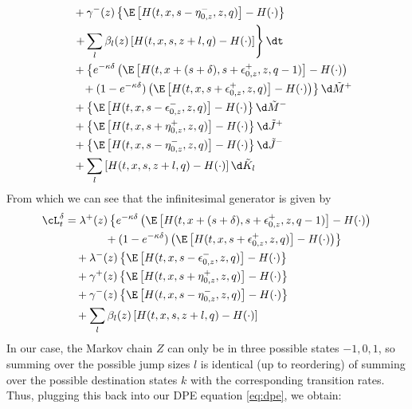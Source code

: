 \documentclass[12pt]{article}
\begin{document}
\begin{align*}
& \quad + \gamma^-(z) \left\lbrace \E \left[ H(t,x, s-\eta^-_{0,z},z,q) \right] - H(\cdot) \right\rbrace \\
& \left. \quad + \sum_l \beta_l(z) \left[ H(t,x,s,z+l,q) - H(\cdot) \right] \right\rbrace \dt \\
& \quad + \left\lbrace  e^{ -\kappa \delta } \left( \E \left[ H(t,x + (s + \delta), s + \epsilon^+_{0,z}, z, q-1) \right] - H(\cdot) \right) \right. \\
& \left. \phantom{ + \left\lbrace \right.} + (1 - e^{-\kappa \delta}) \left( \E \left[ H(t, x, s+\epsilon^+_{0,z},z,q) \right] - H(\cdot) \right) \right\rbrace \d \tilde{M}^+ \\
& \quad + \left\lbrace \E \left[ H(t,x, s-\epsilon^-_{0,z},z,q) \right] - H(\cdot) \right\rbrace \d \tilde{M}^- \\
& \quad + \left\lbrace \E \left[ H(t,x, s+\eta^+_{0,z},z,q) \right] - H(\cdot) \right\rbrace \d \tilde{J}^+ \\
& \quad + \left\lbrace \E \left[ H(t,x, s-\eta^-_{0,z},z,q) \right] - H(\cdot) \right\rbrace \d \tilde{J}^- \\
& \quad + \sum_l\left[ H(t,x,s,z+l,q) - H(\cdot) \right] \d \tilde{K}_l \\
\end{align*}
From which we can see that the infinitesimal generator is given by
\begin{equation}
\begin{split}
\cL^{\delta}_t & = \lambda^+(z) \left\lbrace  e^{ -\kappa \delta } \left( \E \left[ H(t,x + (s + \delta), s + \epsilon^+_{0,z}, z, q-1) \right] - H(\cdot) \right) \right. \\
& \left. \phantom{\lambda^+(z) \left\lbrace \right.} + (1 - e^{-\kappa \delta}) \left( \E \left[ H(t, x, s+\epsilon^+_{0,z},z,q) \right] - H(\cdot) \right) \right\rbrace \\
& \quad + \lambda^-(z) \left\lbrace \E \left[ H(t,x, s-\epsilon^-_{0,z},z,q) \right] - H(\cdot) \right\rbrace \\
& \quad + \gamma^+(z) \left\lbrace \E \left[ H(t,x, s+\eta^+_{0,z},z,q) \right] - H(\cdot) \right\rbrace \\
& \quad + \gamma^-(z) \left\lbrace \E \left[ H(t,x, s-\eta^-_{0,z},z,q) \right] - H(\cdot) \right\rbrace \\
& \quad + \sum_l \beta_l(z) \left[ H(t,x,s,z+l,q) - H(\cdot) \right]
\end{split}
\end{equation}
In our case, the Markov chain $Z$ can only be in three possible states $-1, 0, 1$, so summing over the possible jump sizes $l$ is identical (up to reordering) of summing over the possible destination states $k$ with the corresponding transition rates. Thus, plugging this back into our DPE equation \ref{eq:dpe}, we obtain:
\end{document}
